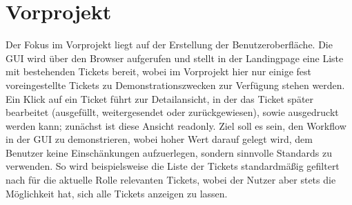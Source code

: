 \section{Vorprojekt}

    Der Fokus im Vorprojekt liegt auf der Erstellung der Benutzeroberfläche. Die GUI wird über den Browser aufgerufen und 
    stellt in der Landingpage eine Liste mit bestehenden Tickets bereit, wobei im Vorprojekt hier nur einige
    fest voreingestellte Tickets zu Demonstrationszwecken zur Verfügung stehen werden. Ein Klick auf ein Ticket führt zur
    Detailansicht, in der das Ticket später bearbeitet (ausgefüllt, weitergesendet oder zurückgewiesen), sowie ausgedruckt werden
    kann; zunächst ist diese Ansicht readonly. Ziel soll es sein, den Workflow in der GUI zu demonstrieren, wobei hoher Wert darauf
    gelegt wird, dem Benutzer keine Einschänkungen aufzuerlegen, sondern sinnvolle Standards zu verwenden. So wird beispielsweise
    die Liste der Tickets standardmäßig gefiltert nach für die aktuelle Rolle relevanten Tickets, wobei der Nutzer aber stets die Möglichkeit
    hat, sich alle Tickets anzeigen zu lassen.

